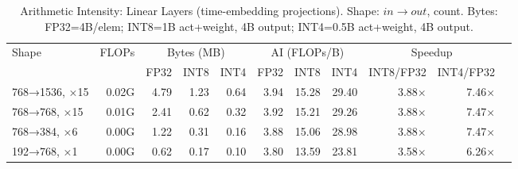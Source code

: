 \begin{table}
  [htbp]
  \centering
  \footnotesize
  \caption{Arithmetic Intensity: Linear Layers (time-embedding projections). Shape: $in \to out$, count. Bytes: FP32=4B/elem; INT8=1B act+weight, 4B output; INT4=0.5B act+weight, 4B output.}
  \label{tab:ai_linear}
  \begin{tabular}{lrrrrrrrrrr}
    \toprule Shape                                          & FLOPs & \multicolumn{3}{c}{Bytes (MB)} & \multicolumn{3}{c}{AI (FLOPs/B)} & \multicolumn{2}{c}{Speedup} \\
    \cmidrule(lr){3-5}\cmidrule(lr){6-8}\cmidrule(lr){9-10} &       & FP32                           & INT8                             & INT4                       & FP32 & INT8  & INT4  & INT8/FP32    & INT4/FP32    \\
    \midrule 768→1536, ×15                                  & 0.02G & 4.79                           & 1.23                             & 0.64                       & 3.94 & 15.28 & 29.40 & 3.88$\times$ & 7.46$\times$ \\
    768→768, ×15                                            & 0.01G & 2.41                           & 0.62                             & 0.32                       & 3.92 & 15.21 & 29.26 & 3.88$\times$ & 7.47$\times$ \\
    768→384, ×6                                             & 0.00G & 1.22                           & 0.31                             & 0.16                       & 3.88 & 15.06 & 28.98 & 3.88$\times$ & 7.47$\times$ \\
    192→768, ×1                                             & 0.00G & 0.62                           & 0.17                             & 0.10                       & 3.80 & 13.59 & 23.81 & 3.58$\times$ & 6.26$\times$ \\
    \bottomrule
  \end{tabular}
\end{table}